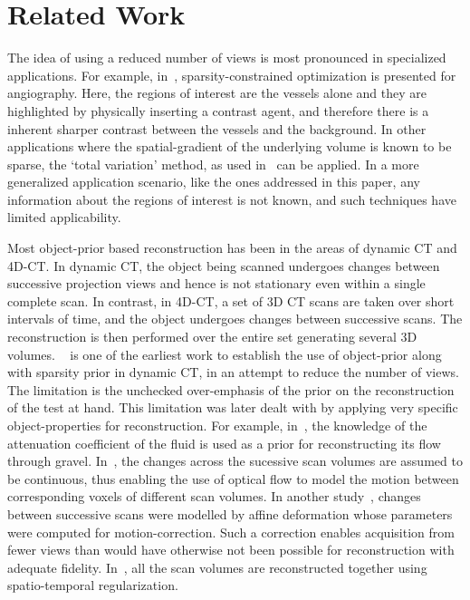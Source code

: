 \documentclass[journal]{IEEEtran}
\begin{document}
 \section{Related Work}
\label{sec:related}
The idea of using a reduced number of views is most pronounced in
specialized applications. For example, in~\cite{Essam2015},
sparsity-constrained optimization is presented for angiography. Here,
the regions of interest are the vessels alone and they are highlighted
by physically inserting a contrast agent, and therefore there is a
inherent sharper contrast between the vessels and the background.  In
other applications where the spatial-gradient of the underlying volume
is known to be sparse, the `total variation' method, as used
in~\cite{Li2015,Polak2017} can be applied.  In a more generalized
application scenario, like the ones addressed in this paper, any
information about the regions of interest is not known, and such
techniques have limited applicability. 


Most object-prior based reconstruction has been in the areas of
dynamic CT and 4D-CT. In dynamic CT, the object being scanned
undergoes changes between successive projection views and hence is not
stationary even within a single complete scan. In contrast, in 4D-CT,
a set of 3D CT scans are taken over short intervals of time, and the
object undergoes changes between successive scans.  The reconstruction
is then performed over the entire set generating several 3D
volumes. ~\cite{PICCS} is one of the earliest work to establish the
use of object-prior along with sparsity prior in dynamic CT, in an
attempt to reduce the number of views. The limitation is the
unchecked over-emphasis of the prior on the reconstruction of the test
at hand. This limitation was later dealt with by applying very
specific object-properties for reconstruction. For example,
in~\cite{Van2015}, the knowledge of the attenuation coefficient of the
fluid is used as a prior for reconstructing its flow through
gravel. In~\cite{Koen2020}, the changes across the sucessive scan
volumes are assumed to be continuous, thus enabling the use of optical
flow to model the motion between corresponding voxels of different
scan volumes. In another study~\cite{vincent2017}, changes between
successive scans were modelled by affine deformation whose parameters
were computed for motion-correction. Such a correction enables
acquisition from fewer views than would have otherwise not been
possible for reconstruction with adequate
fidelity. In~\cite{daniil2015}, all the scan volumes are reconstructed
together using spatio-temporal regularization.
\end{document}
